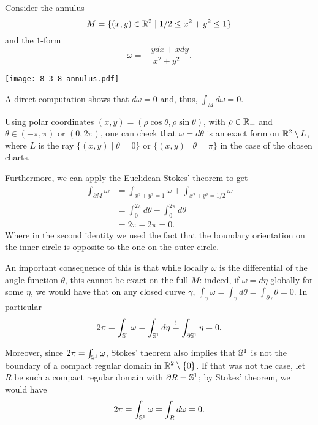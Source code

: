 \begin{example}
	Consider the annulus \[M=\{(x,y)\in\mathbb{R}^2 \mid 1/2\leq x^2+y^2 \leq 1\}\] and the $1$-form \[\omega = \frac{-y dx + x dy}{x^2 + y^2}.\]
	\begin{marginfigure}
		\texttt{[image: 8\_3\_8-annulus.pdf]}
	\end{marginfigure}
	A direct computation shows that $d\omega = 0$ and, thus, $\int_M d\omega = 0$.

	Using polar coordinates $(x,y) = (\rho\cos\theta, \rho\sin\theta)$, with $\rho\in\mathbb{R}_+$ and $\theta \in (-\pi, \pi)$ or $(0, 2\pi)$, one can check that $\omega = d\theta$ is an exact form on $\mathbb{R}^2\setminus L$, where $L$ is the ray $\{(x,y) \mid \theta = 0\}$ or $\{(x,y) \mid \theta = \pi\}$ in the case of the chosen charts.

	Furthermore, we can apply the Euclidean Stokes' theorem to get
	\begin{align}
		\int_{\partial M}\omega
		 & = \int_{x^2 + y^2 =1} \omega + \int_{x^2+y^2 =1/2}\omega \\
		 & = \int_{0}^{2\pi} d\theta - \int_0^{2\pi}d \theta        \\
		 & = 2\pi - 2\pi = 0.
	\end{align}
	Where in the second identity we used the fact that the boundary orientation on the inner circle is opposite to the one on the outer circle.

	An important consequence of this is that while locally $\omega$ is the differential of the angle function $\theta$, this cannot be exact on the full $M$: indeed, if $\omega = d\eta$ globally for some $\eta$, we would have that on any closed curve $\gamma$, $\int_\gamma \omega = \int_\gamma d\theta = \int_{\partial\gamma} \theta = 0$. In particular
	\begin{equation}
		2\pi = \int_{\mathbb{S}^1}\omega = \int_{\mathbb{S}^1}d\eta \overset{!}{=} \int_{\partial\mathbb{S}^1}\eta = 0.
	\end{equation}

	Moreover, since $2\pi = \int_{\mathbb{S}^1}\omega$, Stokes' theorem also implies that $\mathbb{S}^1$ is not the boundary of a compact regular domain in $\mathbb{R}^2\setminus\{0\}$. If that was not the case, let $R$ be such a compact regular domain with $\partial R = \mathbb{S}^1$; by Stokes' theorem, we would have
	\begin{equation}
		2\pi = \int_{\mathbb{S}^1}\omega = \int_{R} d\omega = 0.
	\end{equation}
\end{example}

